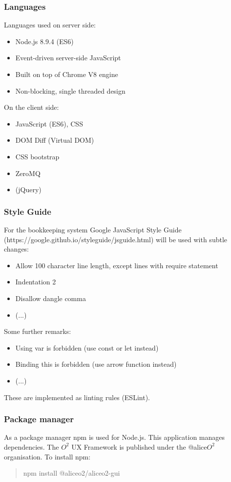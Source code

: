 \subsubsection{Languages}
Languages used on server side:
\begin{itemize}
  \item Node.js 8.9.4 (ES6) 
  \item Event-driven server-side JavaScript
  \item Built on top of Chrome V8 engine
  \item Non-blocking, single threaded design
\end{itemize}

On the client side:
\begin{itemize}
  \item JavaScript (ES6), CSS
  \item DOM Diff (Virtual DOM)
  \item CSS bootstrap
  \item ZeroMQ
  \item (jQuery)
\end{itemize}

\subsubsection{Style Guide}
For the bookkeeping system Google JavaScript Style Guide (https://google.github.io/styleguide/jsguide.html) will be used with subtle changes:
\begin{itemize}
  \item Allow 100 character line length, except lines with require statement
  \item Indentation 2
  \item Disallow dangle comma
  \item (...)
\end{itemize}
Some further remarks:
\begin{itemize}
  \item Using var is forbidden (use const or let instead)
  \item Binding this is forbidden (use arrow function instead)
  \item (...)
\end{itemize}
These are implemented as linting rules (ESLint).

\subsubsection{Package manager}
As a package manager npm is used for Node.js. This application manages dependencies. The $O^2$ UX Framework is published under the @alice$O^2$ organisation. To install npm:
\begin{quote}
  npm install @aliceo2/aliceo2-gui
\end{quote}

